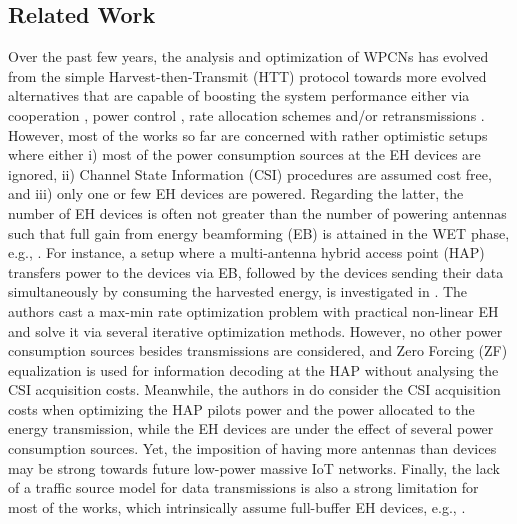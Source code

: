 \documentclass[10pt,journal,a4paper]{IEEEtran}
\begin{document}
	\subsection{Related Work}\label{RW}
	Over the past few years, the analysis and optimization of WPCNs has evolved  from the simple Harvest-then-Transmit (HTT) protocol \cite{Ju.2014,Lopez.2017,Huang.2016}  towards more evolved alternatives that are capable of boosting the system performance either via cooperation \cite{Chen.2015}, power control \cite{Lopez.2018}, rate allocation schemes \cite{LopezFernandez.2018} and/or  retransmissions \cite{Makki.2016}. However, most of the works so far are concerned with rather optimistic setups where either i) most of the power consumption sources at the EH devices are ignored, ii) Channel State Information (CSI) procedures are assumed cost free, and iii) only one or few EH devices are powered. Regarding the latter, the number of EH devices is often not greater than the number of powering antennas such that full gain from energy beamforming (EB) is attained in the WET phase, e.g., \cite{Huang.2016,Cantos.2019,Du.2020}. For instance,  a setup where a multi-antenna hybrid access point (HAP) transfers power to the devices via EB, followed by the devices sending their data simultaneously by consuming the harvested energy, is investigated in \cite{Cantos.2019}. The authors cast a max-min rate optimization problem with practical non-linear EH and solve it via several iterative optimization methods. However, no other power consumption sources besides transmissions are considered, and Zero Forcing (ZF) equalization is used for information decoding at the HAP  without analysing the CSI acquisition costs. Meanwhile, the authors in \cite{Du.2020} do consider the CSI acquisition costs when optimizing the HAP pilots power and the power allocated to the energy transmission, while the EH devices are under the effect of several power consumption sources. Yet, the imposition of having more antennas than devices may be strong towards  future low-power massive IoT networks. Finally, the lack of a traffic source model for data transmissions is also a strong limitation for most of the works, which intrinsically assume full-buffer EH devices, e.g., \cite{Ju.2014,Lopez.2017,Huang.2016,Chen.2015,Lopez.2018,LopezFernandez.2018,Makki.2016,Cantos.2019,Du.2020}.
	
\end{document}

